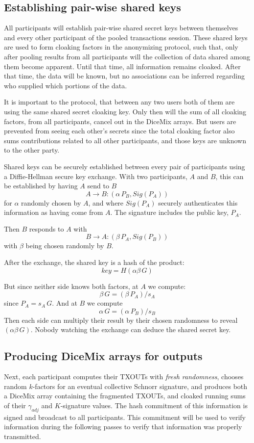 \documentclass[8pt,fleqn,openany]{book}
\begin{document}
\subsection{Establishing pair-wise shared keys} 
All participants will establish pair-wise shared secret keys between themselves and every other participant of the pooled transactions session. These shared keys are used to form cloaking factors in the anonymizing protocol, such that, only after pooling results from all participants will the collection of data shared among them become apparent. Until that time, all information remains cloaked. After that time, the data will be known, but no associations can be inferred regarding who supplied which portions of the data. 

It is important to the protocol, that between any two users both of them are using the same shared secret cloaking key. Only then will the sum of all cloaking factors, from all participants, cancel out in the DiceMix arrays. But users are prevented from seeing each other's secrets since the total cloaking factor also sums contributions related to all other participants, and those keys are unknown to the other party.

Shared keys can be securely established between every pair of participants using a Diffie-Hellman secure key exchange\cite{c21}. With two participants, $A$ and $B$, this can be established by having $A$ send to $B$
$$A \rightarrow B: (\alpha \, P_B, Sig(P_A))$$
for $\alpha$ randomly chosen by $A$, and where $Sig(P_A)$ securely authenticates this information as having come from $A$. The signature includes the public key, $P_A$. 

Then $B$ responds to $A$ with
$$B \rightarrow A: (\beta \, P_A, Sig(P_B))$$
with $\beta$ being chosen randomly by $B$. 

After the exchange, the shared key is a hash of the product:
$$key = H(\alpha \beta \, G)$$ 

But since neither side knows both factors, at $A$ we compute:
$$\beta \, G = (\beta \, P_A) / s_A$$
since $P_A = s_A \, G$. And at $B$ we compute
$$\alpha \, G = (\alpha \, P_B) / s_B$$
Then each side can multiply their result by their chosen randomness to reveal $(\alpha \beta \, G)$. Nobody watching the exchange can deduce the shared secret key.

\subsection{Producing DiceMix arrays for outputs} 
Next, each participant computes their TXOUTs with \textit{fresh randomness}, chooses random $k$-factors for an eventual collective Schnorr signature, and produces both a DiceMix array containing the fragmented TXOUTs, and cloaked running sums of their $\gamma_{adj}$ and $K$-signature values. The hash commitment of this information is signed and broadcast to all participants. This commitment will be used to verify information during the following passes to verify that information was properly transmitted.
\end{document}

